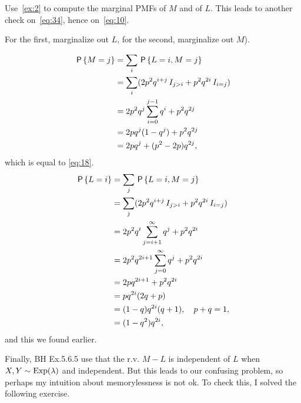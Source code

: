 \documentclass[a4paper,12pt]{article}
\begin{document}
\begin{exercise}\label{ex:8}
Use~\cref{ex:2} to compute the marginal PMFs of $M$ and of $L$. This leads to another check on~\cref{eq:34}, hence on~\cref{eq:10}. 
\begin{hint}
For the first, marginalize out $L$, for the second, marginalize out $M$).
\end{hint}
\begin{solution}
  \begin{align}
\,\mathsf{P}\left\{M=j\right\}    
&= \sum_{i} \,\mathsf{P}\left\{L=i, M=j\right\} \\
 &= \sum_{i} (2p^{2}q^{i+j}\,I_{j>i}+ p^{2}q^{2i}\,I_{i=j}) \\
 &= 2p^2q^j\sum_{i=0}^{j-1} q^{i}+ p^{2}q^{2j} \label{eq:38}\\
 &= 2pq^j (1-q^{j})+ p^{2}q^{2j} \\
 &= 2pq^j + (p^{2}-2p) q^{2j},
  \end{align}
which is equal to \cref{eq:18}.
  \begin{align}
\,\mathsf{P}\left\{L=i\right\}    
&= \sum_{j} \,\mathsf{P}\left\{L=i, M=j\right\} \\
 &= \sum_{j} (2p^{2}q^{i+j}\,I_{j>i}+ p^{2}q^{2i}\,I_{i=j}) \\
 &= 2p^2q^i\sum_{j=i+1}^{\infty} q^{j}+ p^{2}q^{2i} \\
 &= 2p^{2}q^{2i+1} \sum_{j=0}^{\infty}q^{j}+ p^{2}q^{2i} \\
 &= 2pq^{2i+1} + p^{2} q^{2i}\\
 &= pq^{2i}(2q+p)\\
 &= (1-q)q^{2i}(q + 1), \quad p+q=1,\\
 &= (1-q^{2})q^{2i},
  \end{align}
and this we found earlier.
\end{solution}
\end{exercise}


Finally, BH Ex.5.6.5 use that the r.v.
$M-L$ is independent of $L$ when $X, Y\sim\mathrm{Exp}(\lambda)$ and independent.
But this leads to our confusing problem, so perhaps my intuition about memorylessness is not ok.
To check this, I solved  the following exercise.  
\end{document}
